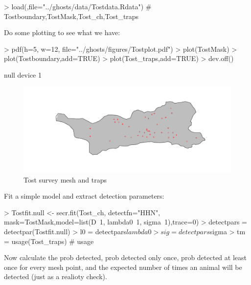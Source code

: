 \documentclass{article}
\begin{document}
\small{
\begin{Schunk}
\begin{Sinput}
> load(,file="../ghosts/data/Tostdata.Rdata") # Tostboundary,TostMask,Tost_ch,Tost_traps
\end{Sinput}
\end{Schunk}

Do some plotting to see what we have:

\begin{Schunk}
\begin{Sinput}
> pdf(h=5, w=12, file="../ghosts/figures/Tostplot.pdf")
> plot(TostMask)
> plot(Tostboundary,add=TRUE)
> plot(Tost_traps,add=TRUE)
> dev.off()
\end{Sinput}
\begin{Soutput}
null device 
          1 
\end{Soutput}
\end{Schunk}

\begin{figure}
\begin{centering}
\includegraphics[width=16cm]{../ghosts/figures/Tostplot.pdf}
\caption{Tost survey mesh and traps}
\label{fig:Tostplot}
\end{centering}
\end{figure}

Fit a simple model and extract detection parameters:

\begin{Schunk}
\begin{Sinput}
> Tostfit.null <- secr.fit(Tost_ch, detectfn="HHN", mask=TostMask,model=list(D~1, lambda0~1, sigma~1),trace=0)
> detectpars = detectpar(Tostfit.null)
> l0 = detectpars$lambda0
> sig = detectpars$sigma
> tm = usage(Tost_traps) # usage
\end{Sinput}
\end{Schunk}
}

Now calculate the prob detected, prob detected only once, prob detected at least once for every mesh point, and the expected number of times an animal will be detected (just as a realioty check).
\end{document}
